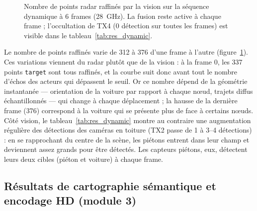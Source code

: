 \documentclass[12pt,a4paper,titlepage]{article}
\begin{document}
\begin{figure}[H]
    \centering
    \caption{Nombre de points radar raffinés par la vision sur la séquence dynamique à 6 frames (28~GHz). La fusion reste active à chaque frame ; l'occultation de TX4 (0 détection sur toutes les frames) est visible dans le tableau~\ref{tab:res_dynamic}.}
    \label{fig:chart_dynamic}
\end{figure}

Le nombre de points raffinés varie de 312 à 376 d'une frame à l'autre (figure~\ref{fig:chart_dynamic}). Ces variations viennent du radar plutôt que de la vision : à la frame 0, les 337 points \texttt{target} sont tous raffinés, et la courbe suit donc avant tout le nombre d'échos des acteurs qui dépassent le seuil. Or ce nombre dépend de la géométrie instantanée --- orientation de la voiture par rapport à chaque n\oe ud, trajets diffus échantillonnés --- qui change à chaque déplacement ; la hausse de la dernière frame (376) correspond à la voiture qui se présente plus de face à certains n\oe uds. Côté vision, le tableau~\ref{tab:res_dynamic} montre au contraire une augmentation régulière des détections des caméras en toiture (TX2 passe de 1 à 3--4 détections) : en se rapprochant du centre de la scène, les piétons entrent dans leur champ et deviennent assez grands pour être détectés. Les capteurs piétons, eux, détectent leurs deux cibles (piéton et voiture) à chaque frame.

\subsection{Résultats de cartographie sémantique et encodage HD (module 3)}
\label{subsec:res_phase4}
\end{document}

